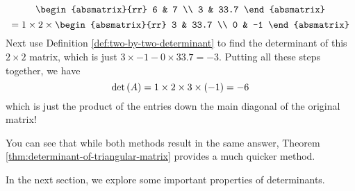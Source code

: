 \begin{solution}
\begin{equation*}
{\begin{absmatrix}{rr}
6 & 7 \\
3 & 33.7
\end{absmatrix} }
\end{equation*}
\begin{equation*}
=1\times 2\times \begin{absmatrix}{rr}
3 & 33.7 \\
0 & -1
\end{absmatrix}
\end{equation*}
Next use Definition \ref{def:two-by-two-determinant} to find the determinant of this $2 \times 2$ matrix, which is
just $3 \times -1  - 0 \times 33.7 = -3$.
Putting all these steps together, we have 
\begin{equation*}
\det \left(A\right)
=
1\times 2\times 3\times \left(-1\right) =-6
\end{equation*}
which is just the product of the entries down the main diagonal of the
original matrix!
\end{solution}

You can see that while both methods result in the same answer, Theorem \ref{thm:determinant-of-triangular-matrix} provides
a much quicker method. 

In the next section, we explore some important properties of determinants.